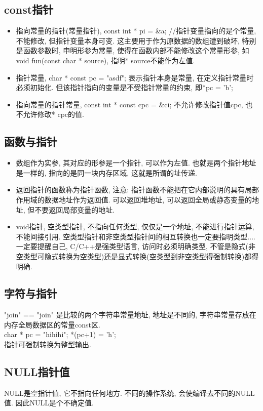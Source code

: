 \documentclass[a4paper,10pt,english]{article}
\begin{document}
\subsection {const指针}
\begin{itemize}
\item 指向常量的指针(常量指针), const int * pi = \&a; //指针变量指向的是个常量, 不能修改, 但指针变量本身可变. 这主要用于作为原数据的数组遭到破坏, 特别是函数参数时, 申明形参为常量, 使得在函数内部不能修改这个常量形参, 如 void fun(const char * source), 指明* source不能作为左值.
\item 指针常量, char * const pc = "asdf"; 表示指针本身是常量, 在定义指针常量时必须初始化. 但该指针指向的变量是不受指针常量的约束, 即*pc = 'b';
\item 指向常量的指针常量, const int * const cpc = \&ci; 不允许修改指针值cpc, 也不允许修改* cpc的值.
\end{itemize}

\subsection {函数与指针}
\begin{itemize}
\item 数组作为实参, 其对应的形参是一个指针, 可以作为左值. 也就是两个指针地址是一样的, 指向的是同一块内存区域, 这就是所谓的址传递. \\
\item 返回指针的函数称为指针函数, 注意: 指针函数不能把在它内部说明的具有局部作用域的数据地址作为返回值. 可以返回堆地址, 可以返回全局或静态变量的地址, 但不要返回局部变量的地址.
\item void指针, 空类型指针, 不指向任何类型, 仅仅是一个地址, 不能进行指针运算, 不能间接引用. 空类型指针和非空类型指针间的相互转换也一定要指明类型....一定要提醒自己, C/C++是强类型语言, 访问时必须明确类型, 不管是隐式(非空类型可隐式转换为空类型)还是显式转换(空类型到非空类型得强制转换)都得明确. 
\end{itemize}

\subsection {字符与指针}
"join" == "join" 是比较的两个字符串常量地址, 地址是不同的, 字符串常量存放在内存全局数据区的常量const区. \\
char * pc = "hihihi"; *(pc+1) = 'h'; \\
指针可强制转换为整型输出.

\subsection {NULL指针值}
NULL是空指针值, 它不指向任何地方. 不同的操作系统, 会使编译去不同的NULL值. 因此NULL是个不确定值.
\end{document}
